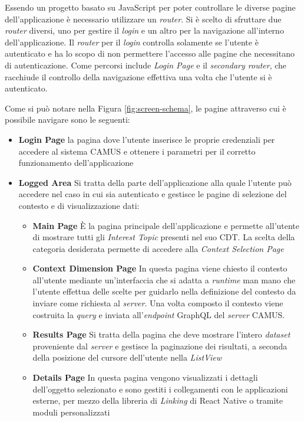 Essendo un progetto basato su JavaScript per poter controllare le diverse pagine dell'applicazione è necessario utilizzare un \emph{router}. Si è scelto di sfruttare due \emph{router} diversi, uno per gestire il \emph{login} e un altro per la navigazione all'interno dell'applicazione. Il \emph{router} per il \emph{login} controlla solamente se l'utente è autenticato e ha lo scopo di non permettere l'accesso alle pagine che necessitano di autenticazione. Come percorsi include \emph{Login Page} e il \emph{secondary router}, che racchiude il controllo della navigazione effettiva una volta che l'utente si è autenticato.

Come si può notare nella Figura \ref{fig:screen-schema}, le pagine attraverso cui è possibile navigare sono le seguenti:

\begin{itemize}
	\item \textbf{Login Page}
	\upe la pagina dove l'utente inserisce le proprie credenziali per accedere al sistema CAMUS e ottenere i parametri per il corretto funzionamento dell'applicazione
	\item \textbf{Logged Area}
	Si tratta della parte dell'applicazione alla quale l'utente può accedere nel caso in cui sia autenticato e gestisce le pagine di selezione del contesto e di visualizzazione dati:
	\begin{itemize}
		\item \textbf{Main Page}
		È la pagina principale dell'applicazione e permette all'utente di mostrare tutti gli \emph{Interest Topic} presenti nel suo CDT. La scelta della categoria desiderata permette di accedere alla \emph{Context Selection Page}
		\item \textbf{Context Dimension Page}
		In questa pagina viene chiesto il contesto all'utente mediante un'interfaccia che si adatta a \emph{runtime} man mano che l'utente effettua delle scelte per guidarlo nella definizione del contesto da inviare come richiesta al \emph{server}. Una volta composto il contesto viene costruita la \emph{query} e inviata all'\emph{endpoint} GraphQL del \emph{server} CAMUS. 
		\item \textbf{Results Page}
		Si tratta della pagina che deve mostrare l'intero \emph{dataset} proveniente dal \emph{server} e gestisce la paginazione dei risultati, a seconda della posizione del cursore dell'utente nella \emph{ListView} 
		\item \textbf{Details Page}
		In questa pagina vengono visualizzati i dettagli dell'oggetto selezionato e sono gestiti i collegamenti con le applicazioni esterne, per mezzo della libreria di \emph{Linking} di React Native o tramite moduli personalizzati
	\end{itemize}
\end{itemize}

